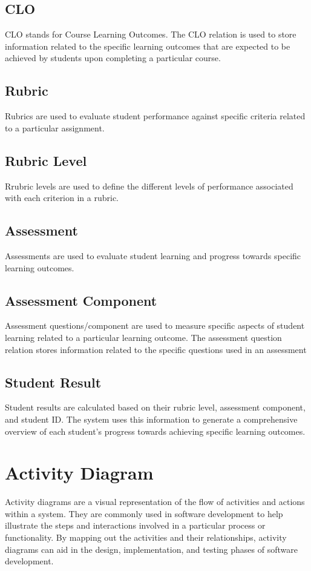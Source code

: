\documentclass[12pt,a4paper]{article}
\begin{document}
\subsection{CLO}
CLO stands for Course Learning Outcomes. The CLO relation is used to store information related to the specific learning outcomes that are expected to be achieved by students upon completing a particular course. 
\subsection{Rubric}
Rubrics are used to evaluate student performance against specific criteria related to a particular assignment.
\subsection{Rubric Level}
Rrubric levels are used to define the different levels of performance associated with each criterion in a rubric. 
\subsection{Assessment}
Assessments are used to evaluate student learning and progress towards specific learning outcomes. 
\subsection{Assessment Component}
Assessment questions/component are used to measure specific aspects of student learning related to a particular learning outcome. The assessment question relation stores information related to the specific questions used in an assessment
\subsection{Student Result}
Student results are calculated based on their rubric level, assessment component, and student ID. The system uses this information to generate a comprehensive overview of each student's progress towards achieving specific learning outcomes. 
\section{Activity Diagram}
Activity diagrams are a visual representation of the flow of activities and actions within a system. They are commonly used in software development to help illustrate the steps and interactions involved in a particular process or functionality. By mapping out the activities and their relationships, activity diagrams can aid in the design, implementation, and testing phases of software development.
\end{document}
